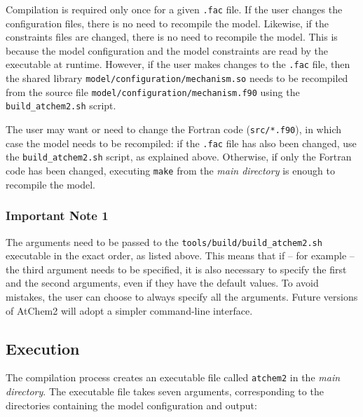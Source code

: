 Compilation is required only once for a given \texttt{.fac} file. If
the user changes the configuration files, there is no need to
recompile the model. Likewise, if the constraints files are changed,
there is no need to recompile the model. This is because the model
configuration and the model constraints are read by the executable at
runtime. However, if the user makes changes to the \texttt{.fac} file,
then the shared library \texttt{model/configuration/mechanism.so}
needs to be recompiled from the source file
\texttt{model/configuration/mechanism.f90} using the \texttt{build\_atchem2.sh}
script.

The user may want or need to change the Fortran code
(\texttt{src/*.f90}), in which case the model needs to be recompiled:
if the \texttt{.fac} file has also been changed, use the
\texttt{build\_atchem2.sh} script, as explained above. Otherwise, if only the
Fortran code has been changed, executing \texttt{make} from the
\emph{main directory} is enough to recompile the model.

\subsubsection{Important Note 1} \label{important-note-1}

The arguments need to be passed to the \texttt{tools/build/build\_atchem2.sh}
executable in the exact order, as listed above. This means that if --
for example -- the third argument needs to be specified, it is also
necessary to specify the first and the second arguments, even if they
have the default values. To avoid mistakes, the user can choose to
always specify all the arguments. Future versions of AtChem2 will
adopt a simpler command-line interface.

\subsection{Execution} \label{subsec:execution}

The compilation process creates an executable file called
\texttt{atchem2} in the \emph{main directory}. The executable file
takes seven arguments, corresponding to the directories containing the
model configuration and output:

